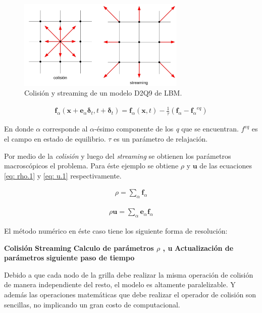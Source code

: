 \begin{figure}[h!]
	\centering
	\includegraphics[width=8cm]{grilla_stre_colli_intro.png}
	\caption{Colisión y streaming de un modelo D2Q9 de LBM.}
	\label{fig:grilla_D2Q9}
\end{figure}


\begin{align}
	\mathbf{f}_{\alpha} (\mathbf{x} + \mathbf{e}_{\alpha} \mathbf{\delta}_{t}, t + \mathbf{\delta}_{t})  = \mathbf{f}_{\alpha} (\mathbf{x}, t) - \frac{1}{\tau} (\mathbf{f}_{\alpha} - {\mathbf{f}_{\alpha}}^{eq})
	\label{eq:field_intro} 
\end{align}

En donde $\alpha$ corresponde al  $\alpha$-ésimo componente de los \textit{q} que se encuentran. $f^{eq}$ es el campo en estado de equilibrio. $\tau$ es un parámetro de relajación. 

Por medio de la \textit{colisión} y luego del \textit{streaming} se obtienen los parámetros macroscópicos el problema. Para éste ejemplo se obtiene $\rho$ y $\mathbf{u}$ de las ecuaciones \ref{eq: rho.1} y \ref{eq: u.1} respectivamente.

\begin{align}
	\rho = \sum_{\alpha} \mathbf{f}_{\alpha}
	\label{eq: rho.1}
\end{align}

\begin{align}
	\rho \mathbf{u}= \sum_{\alpha} \mathbf{e}_{\alpha} \mathbf{f}_{\alpha}
	\label{eq: u.1}
\end{align}

El método numérico en éste caso tiene los siguiente forma de resolución:

	 \textbf{Colisión}  \textbf{Streaming} \textbf{Calculo de parámetros $\rho$ , u} \textbf{Actualización de parámetros} \textbf{siguiente paso de tiempo} 

Debido a que cada nodo de la grilla debe realizar la misma operación de colisión de manera independiente del resto, el modelo es altamente paralelizable. Y además las operaciones matemáticas que debe realizar el operador de colisión son sencillas, no implicando un gran costo de computacional.

